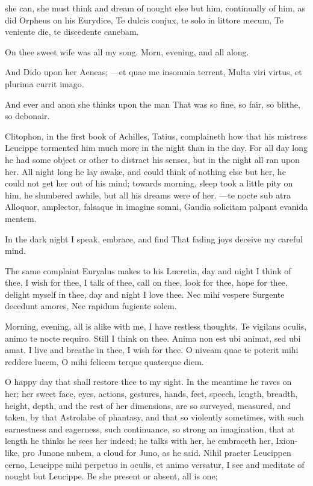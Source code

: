 she can, she must think and dream of nought else but him, continually
of him, as did Orpheus on his Eurydice,
Te dulcis conjux, te solo in littore mecum,
Te veniente die, te discedente canebam.

On thee sweet wife was all my song.
Morn, evening, and all along.

And Dido upon her Aeneas;
---et quae me insomnia terrent,
Multa viri virtus, et plurima currit imago.

And ever and anon she thinks upon the man
That was so fine, so fair, so blithe, so debonair.

Clitophon, in the first book of Achilles, Tatius, complaineth how that
his mistress Leucippe tormented him much more in the night than in the
day. For all day long he had some object or other to distract his
senses, but in the night all ran upon her. All night long he lay 
awake, and could think of nothing else but her, he could not get her
out of his mind; towards morning, sleep took a little pity on him, he
slumbered awhile, but all his dreams were of her.
---te nocte sub atra
Alloquor, amplector, falsaque in imagine somni,
Gaudia solicitam palpant evanida mentem.

In the dark night I speak, embrace, and find
That fading joys deceive my careful mind.

The same complaint Euryalus makes to his Lucretia, day and night
I think of thee, I wish for thee, I talk of thee, call on thee, look
for thee, hope for thee, delight myself in thee, day and night I love
thee.
Nec mihi vespere
Surgente decedunt amores,
Nec rapidum fugiente solem.

Morning, evening, all is alike with me, I have restless thoughts,
 Te vigilans oculis, animo te nocte requiro. Still I think on
thee. Anima non est ubi animat, sed ubi amat. I live and breathe in
thee, I wish for thee.
O niveam quae te poterit mihi reddere lucem,
O mihi felicem terque quaterque diem.

O happy day that shall restore thee to my sight. In the meantime he
raves on her; her sweet face, eyes, actions, gestures, hands, feet,
speech, length, breadth, height, depth, and the rest of her dimensions,
are so surveyed, measured, and taken, by that Astrolabe of phantasy,
and that so violently sometimes, with such earnestness and eagerness,
such continuance, so strong an imagination, that at length he thinks he
sees her indeed; he talks with her, he embraceth her, Ixion-like, pro
Junone nubem, a cloud for Juno, as he said. Nihil praeter Leucippen
cerno, Leucippe mihi perpetuo in oculis, et animo versatur, I see and
meditate of nought but Leucippe. Be she present or absent, all is one;

